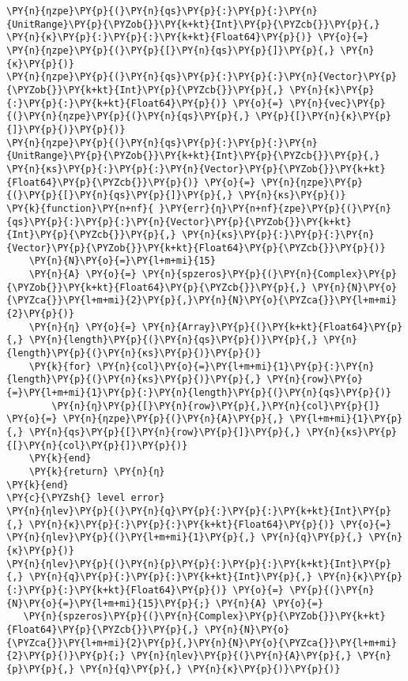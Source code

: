 \begin{Verbatim}[commandchars=\\\{\}]
\PY{n}{ηzpe}\PY{p}{(}\PY{n}{qs}\PY{p}{:}\PY{p}{:}\PY{n}{UnitRange}\PY{p}{\PYZob{}}\PY{k+kt}{Int}\PY{p}{\PYZcb{}}\PY{p}{,} \PY{n}{κ}\PY{p}{:}\PY{p}{:}\PY{k+kt}{Float64}\PY{p}{)} \PY{o}{=} \PY{n}{ηzpe}\PY{p}{(}\PY{p}{[}\PY{n}{qs}\PY{p}{]}\PY{p}{,} \PY{n}{κ}\PY{p}{)}
\PY{n}{ηzpe}\PY{p}{(}\PY{n}{qs}\PY{p}{:}\PY{p}{:}\PY{n}{Vector}\PY{p}{\PYZob{}}\PY{k+kt}{Int}\PY{p}{\PYZcb{}}\PY{p}{,} \PY{n}{κ}\PY{p}{:}\PY{p}{:}\PY{k+kt}{Float64}\PY{p}{)} \PY{o}{=} \PY{n}{vec}\PY{p}{(}\PY{n}{ηzpe}\PY{p}{(}\PY{n}{qs}\PY{p}{,} \PY{p}{[}\PY{n}{κ}\PY{p}{]}\PY{p}{)}\PY{p}{)}
\PY{n}{ηzpe}\PY{p}{(}\PY{n}{qs}\PY{p}{:}\PY{p}{:}\PY{n}{UnitRange}\PY{p}{\PYZob{}}\PY{k+kt}{Int}\PY{p}{\PYZcb{}}\PY{p}{,} \PY{n}{κs}\PY{p}{:}\PY{p}{:}\PY{n}{Vector}\PY{p}{\PYZob{}}\PY{k+kt}{Float64}\PY{p}{\PYZcb{}}\PY{p}{)} \PY{o}{=} \PY{n}{ηzpe}\PY{p}{(}\PY{p}{[}\PY{n}{qs}\PY{p}{]}\PY{p}{,} \PY{n}{κs}\PY{p}{)}
\PY{k}{function}\PY{n+nf}{ }\PY{err}{η}\PY{n+nf}{zpe}\PY{p}{(}\PY{n}{qs}\PY{p}{:}\PY{p}{:}\PY{n}{Vector}\PY{p}{\PYZob{}}\PY{k+kt}{Int}\PY{p}{\PYZcb{}}\PY{p}{,} \PY{n}{κs}\PY{p}{:}\PY{p}{:}\PY{n}{Vector}\PY{p}{\PYZob{}}\PY{k+kt}{Float64}\PY{p}{\PYZcb{}}\PY{p}{)}
    \PY{n}{N}\PY{o}{=}\PY{l+m+mi}{15}
    \PY{n}{A} \PY{o}{=} \PY{n}{spzeros}\PY{p}{(}\PY{n}{Complex}\PY{p}{\PYZob{}}\PY{k+kt}{Float64}\PY{p}{\PYZcb{}}\PY{p}{,} \PY{n}{N}\PY{o}{\PYZca{}}\PY{l+m+mi}{2}\PY{p}{,}\PY{n}{N}\PY{o}{\PYZca{}}\PY{l+m+mi}{2}\PY{p}{)}
    \PY{n}{η} \PY{o}{=} \PY{n}{Array}\PY{p}{(}\PY{k+kt}{Float64}\PY{p}{,} \PY{n}{length}\PY{p}{(}\PY{n}{qs}\PY{p}{)}\PY{p}{,} \PY{n}{length}\PY{p}{(}\PY{n}{κs}\PY{p}{)}\PY{p}{)}
    \PY{k}{for} \PY{n}{col}\PY{o}{=}\PY{l+m+mi}{1}\PY{p}{:}\PY{n}{length}\PY{p}{(}\PY{n}{κs}\PY{p}{)}\PY{p}{,} \PY{n}{row}\PY{o}{=}\PY{l+m+mi}{1}\PY{p}{:}\PY{n}{length}\PY{p}{(}\PY{n}{qs}\PY{p}{)}
        \PY{n}{η}\PY{p}{[}\PY{n}{row}\PY{p}{,}\PY{n}{col}\PY{p}{]} \PY{o}{=} \PY{n}{ηzpe}\PY{p}{(}\PY{n}{A}\PY{p}{,} \PY{l+m+mi}{1}\PY{p}{,} \PY{n}{qs}\PY{p}{[}\PY{n}{row}\PY{p}{]}\PY{p}{,} \PY{n}{κs}\PY{p}{[}\PY{n}{col}\PY{p}{]}\PY{p}{)}
    \PY{k}{end}
    \PY{k}{return} \PY{n}{η}
\PY{k}{end}
\PY{c}{\PYZsh{} level error}
\PY{n}{ηlev}\PY{p}{(}\PY{n}{q}\PY{p}{:}\PY{p}{:}\PY{k+kt}{Int}\PY{p}{,} \PY{n}{κ}\PY{p}{:}\PY{p}{:}\PY{k+kt}{Float64}\PY{p}{)} \PY{o}{=} \PY{n}{ηlev}\PY{p}{(}\PY{l+m+mi}{1}\PY{p}{,} \PY{n}{q}\PY{p}{,} \PY{n}{κ}\PY{p}{)}
\PY{n}{ηlev}\PY{p}{(}\PY{n}{p}\PY{p}{:}\PY{p}{:}\PY{k+kt}{Int}\PY{p}{,} \PY{n}{q}\PY{p}{:}\PY{p}{:}\PY{k+kt}{Int}\PY{p}{,} \PY{n}{κ}\PY{p}{:}\PY{p}{:}\PY{k+kt}{Float64}\PY{p}{)} \PY{o}{=} \PY{p}{(}\PY{n}{N}\PY{o}{=}\PY{l+m+mi}{15}\PY{p}{;} \PY{n}{A} \PY{o}{=}
   \PY{n}{spzeros}\PY{p}{(}\PY{n}{Complex}\PY{p}{\PYZob{}}\PY{k+kt}{Float64}\PY{p}{\PYZcb{}}\PY{p}{,} \PY{n}{N}\PY{o}{\PYZca{}}\PY{l+m+mi}{2}\PY{p}{,}\PY{n}{N}\PY{o}{\PYZca{}}\PY{l+m+mi}{2}\PY{p}{)}\PY{p}{;} \PY{n}{ηlev}\PY{p}{(}\PY{n}{A}\PY{p}{,} \PY{n}{p}\PY{p}{,} \PY{n}{q}\PY{p}{,} \PY{n}{κ}\PY{p}{)}\PY{p}{)}

\end{Verbatim}
